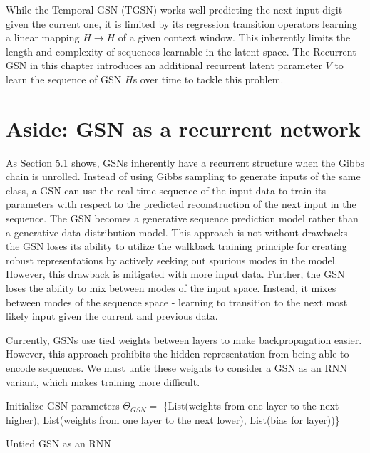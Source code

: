 While the Temporal GSN (TGSN) works well predicting the next input digit given the current one, it is limited by its regression transition operators learning a linear mapping \(H \rightarrow H\) of a given context window. This inherently limits the length and complexity of sequences learnable in the latent space. The Recurrent GSN in this chapter introduces an additional recurrent latent parameter \(V\) to learn the sequence of GSN \(H\)s over time to tackle this problem.

\section{Aside: GSN as a recurrent network}
As Section 5.1 shows, GSNs inherently have a recurrent structure when the Gibbs chain is unrolled. Instead of using Gibbs sampling to generate inputs of the same class, a GSN can use the real time sequence of the input data to train its parameters with respect to the predicted reconstruction of the next input in the sequence. The GSN becomes a generative sequence prediction model rather than a generative data distribution model. This approach is not without drawbacks - the GSN loses its ability to utilize the walkback training principle for creating robust representations by actively seeking out spurious modes in the model. However, this drawback is mitigated with more input data.  Further, the GSN loses the ability to mix between modes of the input space. Instead, it mixes between modes of the sequence space - learning to transition to the next most likely input given the current and previous data.

Currently, GSNs use tied weights between layers to make backpropagation easier. However, this approach prohibits the hidden representation from being able to encode sequences. We must untie these weights to consider a GSN as an RNN variant, which makes training more difficult.

\begin{algorithm}[h!]
	Initialize GSN parameters \(\Theta_{GSN} = \) \{List(weights from one layer to the next higher), List(weights from one layer to the next lower), List(bias for layer))\}\;
	\caption{ Untied GSN as an RNN }
\end{algorithm}

